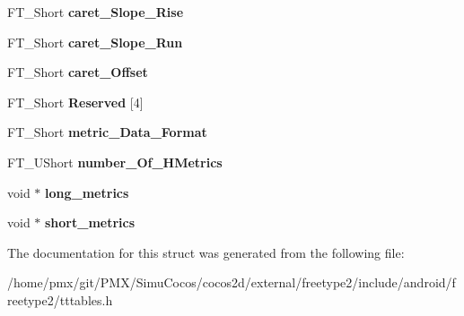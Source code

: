 \begin{DoxyCompactItemize}
\mbox{\label{structTT__HoriHeader___aeb43d92f56de424d8f28bd389973eca4}} 
F\+T\+\_\+\+Short {\bfseries caret\+\_\+\+Slope\+\_\+\+Rise}
\item 
\mbox{\label{structTT__HoriHeader___acce162ae0554006c11a3383bd3454d69}} 
F\+T\+\_\+\+Short {\bfseries caret\+\_\+\+Slope\+\_\+\+Run}
\item 
\mbox{\label{structTT__HoriHeader___a791ad767d54cc87e84d9b03d6739f0eb}} 
F\+T\+\_\+\+Short {\bfseries caret\+\_\+\+Offset}
\item 
\mbox{\label{structTT__HoriHeader___a0d7faed1a505e33bee989fced8f04e82}} 
F\+T\+\_\+\+Short {\bfseries Reserved} \mbox{[}4\mbox{]}
\item 
\mbox{\label{structTT__HoriHeader___a0ed857e9629d2dfb5350a6b5976bf933}} 
F\+T\+\_\+\+Short {\bfseries metric\+\_\+\+Data\+\_\+\+Format}
\item 
\mbox{\label{structTT__HoriHeader___aac3ecb9ba7c13436a663b91765e89647}} 
F\+T\+\_\+\+U\+Short {\bfseries number\+\_\+\+Of\+\_\+\+H\+Metrics}
\item 
\mbox{\label{structTT__HoriHeader___a237aa981a8a3ea1b073ce79679a61d88}} 
void $\ast$ {\bfseries long\+\_\+metrics}
\item 
\mbox{\label{structTT__HoriHeader___af36842b401b81eeffdaa763e94922334}} 
void $\ast$ {\bfseries short\+\_\+metrics}
\end{DoxyCompactItemize}


The documentation for this struct was generated from the following file\+:\begin{DoxyCompactItemize}
\item 
/home/pmx/git/\+P\+M\+X/\+Simu\+Cocos/cocos2d/external/freetype2/include/android/freetype2/tttables.\+h\end{DoxyCompactItemize}
